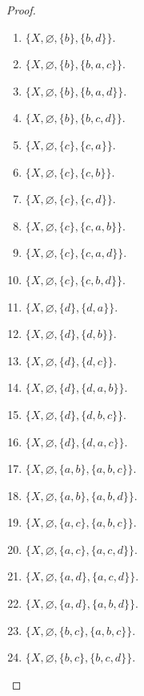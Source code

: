 \begin{proof}
\begin{enumerate}[label={(\roman*)}]
\begin{enumerate}[label={(\arabic*)}]
                  \item $\{ X, \varnothing, \{ b \}, \{ b, d \} \}$.
                  \item $\{ X, \varnothing, \{ b \}, \{ b, a, c \} \}$.
                  \item $\{ X, \varnothing, \{ b \}, \{ b, a, d \} \}$.
                  \item $\{ X, \varnothing, \{ b \}, \{ b, c, d \} \}$.
                  \item $\{ X, \varnothing, \{ c \}, \{ c, a \} \}$.
                  \item $\{ X, \varnothing, \{ c \}, \{ c, b \} \}$.
                  \item $\{ X, \varnothing, \{ c \}, \{ c, d \} \}$.
                  \item $\{ X, \varnothing, \{ c \}, \{ c, a, b \} \}$.
                  \item $\{ X, \varnothing, \{ c \}, \{ c, a, d \} \}$.
                  \item $\{ X, \varnothing, \{ c \}, \{ c, b, d \} \}$.
                  \item $\{ X, \varnothing, \{ d \}, \{ d, a \} \}$.
                  \item $\{ X, \varnothing, \{ d \}, \{ d, b \} \}$.
                  \item $\{ X, \varnothing, \{ d \}, \{ d, c \} \}$.
                  \item $\{ X, \varnothing, \{ d \}, \{ d, a, b \} \}$.
                  \item $\{ X, \varnothing, \{ d \}, \{ d, b, c \} \}$.
                  \item $\{ X, \varnothing, \{ d \}, \{ d, a, c \} \}$.
                  \item $\{ X, \varnothing, \{ a, b \}, \{ a, b, c \} \}$.
                  \item $\{ X, \varnothing, \{ a, b \}, \{ a, b, d \} \}$.
                  \item $\{ X, \varnothing, \{ a, c \}, \{ a, b, c \} \}$.
                  \item $\{ X, \varnothing, \{ a, c \}, \{ a, c, d \} \}$.
                  \item $\{ X, \varnothing, \{ a, d \}, \{ a, c, d \} \}$.
                  \item $\{ X, \varnothing, \{ a, d \}, \{ a, b, d \} \}$.
                  \item $\{ X, \varnothing, \{ b, c \}, \{ a, b, c \} \}$.
                  \item $\{ X, \varnothing, \{ b, c \}, \{ b, c, d \} \}$.

\end{enumerate}
\end{enumerate}
\end{proof}
